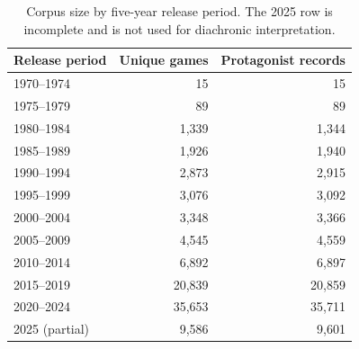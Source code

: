 \begin{table}[t]
\centering
\caption{Corpus size by five-year release period. The 2025 row is incomplete and is not used for diachronic interpretation.}
\label{tab:half_decade_counts}
\small
\setlength{\tabcolsep}{5pt}
\begin{tabular}{lrr}
\toprule
\textbf{Release period} & \textbf{Unique games} & \textbf{Protagonist records} \\
\midrule
1970--1974 & 15 & 15 \\
1975--1979 & 89 & 89 \\
1980--1984 & 1,339 & 1,344 \\
1985--1989 & 1,926 & 1,940 \\
1990--1994 & 2,873 & 2,915 \\
1995--1999 & 3,076 & 3,092 \\
2000--2004 & 3,348 & 3,366 \\
2005--2009 & 4,545 & 4,559 \\
2010--2014 & 6,892 & 6,897 \\
2015--2019 & 20,839 & 20,859 \\
2020--2024 & 35,653 & 35,711 \\
2025 (partial) & 9,586 & 9,601 \\
\bottomrule
\end{tabular}
\end{table}
